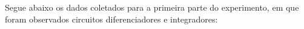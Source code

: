 Segue abaixo os dados coletados para a primeira parte do experimento, em que foram observados circuitos diferenciadores e integradores: 





\pagebreak